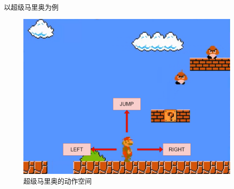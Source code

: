 \begin{frame}{以超级马里奥为例}

    \begin{figure}
        \centering
        \includegraphics[scale=0.18]{pics/mario1.png}
        \caption{超级马里奥的动作空间}
    \end{figure}

\end{frame}

